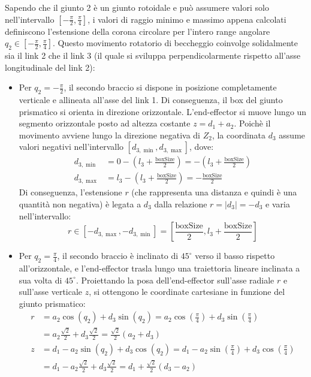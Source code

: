 ﻿\documentclass[11pt, a4paper]{article}
\begin{document}
Sapendo che il giunto 2 è un giunto rotoidale e può assumere valori solo nell'intervallo $[-\frac{\pi}{2}, \frac{\pi}{4}]$, i valori di raggio minimo e massimo appena calcolati definiscono l'estensione della corona circolare per l'intero range angolare $q_{2} \in \left[-\frac{\pi}{2}, \frac{\pi}{4}\right]$. Questo movimento rotatorio di beccheggio coinvolge solidalmente sia il link 2 che il link 3 (il quale si sviluppa perpendicolarmente rispetto all'asse longitudinale del link 2):
\begin{itemize}
  \item Per $q_{2} = -\frac{\pi}{2}$, il secondo braccio si dispone in posizione completamente verticale e allineata all'asse del link 1. Di conseguenza, il box del giunto prismatico si orienta in direzione orizzontale. L'end-effector si muove lungo un segmento orizzontale posto ad altezza costante $z = d_1 + a_2$. Poichè il movimento avviene lungo la direzione negativa di $Z_{2}$, la coordinata $d_{3}$ assume valori negativi nell'intervallo $[ d_{3,\min}, d_{3,\max}]$, dove:
  \begin{align*}
    d_{3,\min} &= 0 - \left(l_{3} + \frac{\text{boxSize}}{2}\right) = - \left(l_{3} + \frac{\text{boxSize}}{2}\right) \\
    d_{3,\max} &= l_3 - \left(l_{3} + \frac{\text{boxSize}}{2}\right) = - \frac{\text{boxSize}}{2}
  \end{align*}
  Di conseguenza, l'estensione $r$ (che rappresenta una distanza e quindi è una quantità non negativa) è legata a $d_3$ dalla relazione $r = |d_3| = -d_{3}$ e varia nell'intervallo:
  \[
    r \in \left[ -d_{3,\max}, -d_{3,\min} \right] = \left[ \frac{\text{boxSize}}{2}, l_3 + \frac{\text{boxSize}}{2} \right]
  \]
  \item Per $q_{2} = \frac{\pi}{4}$, il secondo braccio è inclinato di $45^\circ$ verso il basso rispetto all'orizzontale, e l'end-effector trasla lungo una traiettoria lineare inclinata a sua volta di $45^\circ$. Proiettando la posa dell'end-effector sull'asse radiale $r$ e sull'asse verticale $z$, si ottengono le coordinate cartesiane in funzione del giunto prismatico:
  \begin{align*}
    r &= a_{2}\cos(q_{2}) + d_{3} \sin(q_{2}) = a_{2}\cos\left(\frac{\pi}{4}\right) + d_{3} \sin\left(\frac{\pi}{4}\right)\\
    &=a_{2} \frac{\sqrt{2}}{2} + d_{3} \frac{\sqrt{2}}{2} = \frac{\sqrt{2}}{2} (a_{2} + d_{3})\\
    z &= d_{1} - a_{2} \sin(q_{2}) + d_{3} \cos(q_{2}) = d_{1} - a_{2} \sin\left(\frac{\pi}{4}\right) + d_{3} \cos\left(\frac{\pi}{4}\right)\\
    &= d_{1} - a_{2} \frac{\sqrt{2}}{2} + d_{3} \frac{\sqrt{2}}{2} = d_{1} + \frac{\sqrt{2}}{2} (d_{3} - a_{2})
  \end{align*}
\end{itemize}
\end{document}
